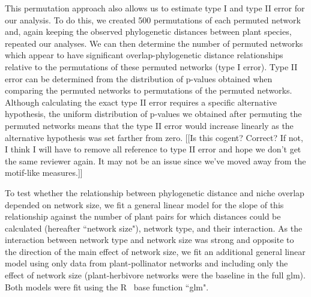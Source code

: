 \documentclass[12pt]{article}
\begin{document}
\begin{spacing}{1.5}
  This permutation approach also allows us to estimate type I and type II 
  error for our analysis. To do this, we created 500 permutations of each 
  permuted network and, again keeping the observed phylogenetic distances 
  between plant species, repeated our analyses. We can then determine the 
  number of permuted networks which appear to have significant 
  overlap-phylogenetic distance relationships relative to the permutations 
  of these permuted networks (type I error). Type II error can be determined
  from the distribution of p-values obtained when comparing the permuted 
  networks to permutations of the permuted networks. Although calculating the
  exact type II error requires a specific alternative hypothesis, the uniform
  distribution of p-values we obtained after permuting the permuted networks
  means that the type II error would increase linearly as the alternative 
  hypothesis was set farther from zero. [[Is this cogent? Correct? If not, I think I
  will have to remove all reference to type II error and hope we don't get the
  same reviewer again. It may not be an issue since we've moved away from the
  motif-like measures.]]


  To test whether the relationship between phylogenetic distance and niche overlap
  depended on network size, we fit a general linear model for the slope  of this relationship against the number of plant pairs for which distances could be calculated (hereafter ``network size"), network type, and their interaction. As the interaction between network type and network size was strong and opposite to the direction of the main effect of network size, we fit an additional general linear model using only data from plant-pollinator networks and including only the effect of network size (plant-herbivore networks were the baseline in the full glm). Both models were fit using the R~\citep{R} base function ``glm".



\end{spacing}
\end{document}
